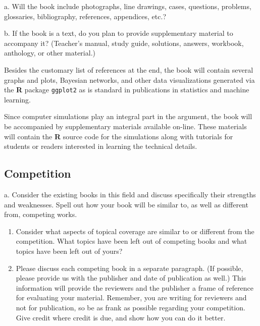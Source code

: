 \documentclass[
  10pt,
  dvipsnames,enabledeprecatedfontcommands]{scrartcl}
\begin{document}
\footnotesize a. Will the book include photographs, line drawings,
cases, questions, problems, glossaries, bibliography, references,
appendices, etc.?

\footnotesize b. If the book is a text, do you plan to provide
supplementary material to accompany it? (Teacher's manual, study guide,
solutions, answers, workbook, anthology, or other material.)

\vspace{2mm}

\normalsize

Besides the customary list of references at the end, the book will
contain several graphs and plots, Bayesian networks, and other data
visualizations generated via the \textbf{\textsf{R}} package
\texttt{ggplot2} as is standard in publications in statistics and
machine learning.

Since computer simulations play an integral part in the argument, the
book will be accompanied by supplementary materials available on-line.
These materials will contain the \textbf{\textsf{R}} source code for the
simulations along with tutorials for students or readers interested in
learning the technical details.

\hypertarget{competition}{%
\subsection{Competition}\label{competition}}

\footnotesize a. Consider the existing books in this field and discuss
specifically their strengths and weaknesses. Spell out how your book
will be similar to, as well as different from, competing works.

\begin{enumerate}
\def\labelenumi{\alph{enumi}.}
\setcounter{enumi}{1}
\item
  Consider what aspects of topical coverage are similar to or different
  from the competition. What topics have been left out of competing
  books and what topics have been left out of yours?
\item
  Please discuss each competing book in a separate paragraph. (If
  possible, please provide us with the publisher and date of publication
  as well.) This information will provide the reviewers and the
  publisher a frame of reference for evaluating your material. Remember,
  you are writing for reviewers and not for publication, so be as frank
  as possible regarding your competition. Give credit where credit is
  due, and show how you can do it better.
\end{enumerate}
\end{document}
